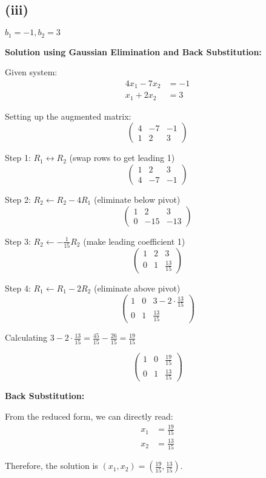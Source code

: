 \subsection*{(iii)} $b_1 = -1, b_2 = 3$

\textbf{Solution using Gaussian Elimination and Back Substitution:}

Given system:
\begin{align}
	4x_1 - 7x_2 & = -1 \\
	x_1 + 2x_2  & = 3
\end{align}

Setting up the augmented matrix:
\[
	\left(\begin{array}{cc|c}
			4 & -7 & -1 \\
			1 & 2  & 3
		\end{array}\right)
\]

Step 1: $R_1 \leftrightarrow R_2$ (swap rows to get leading 1)
\[
	\left(\begin{array}{cc|c}
			1 & 2  & 3  \\
			4 & -7 & -1
		\end{array}\right)
\]

Step 2: $R_2 \leftarrow R_2 - 4R_1$ (eliminate below pivot)
\[
	\left(\begin{array}{cc|c}
			1 & 2   & 3   \\
			0 & -15 & -13
		\end{array}\right)
\]

Step 3: $R_2 \leftarrow -\frac{1}{15}R_2$ (make leading coefficient 1)
\[
	\left(\begin{array}{cc|c}
			1 & 2 & 3             \\
			0 & 1 & \frac{13}{15}
		\end{array}\right)
\]

Step 4: $R_1 \leftarrow R_1 - 2R_2$ (eliminate above pivot)
\[
	\left(\begin{array}{cc|c}
			1 & 0 & 3 - 2 \cdot \frac{13}{15} \\
			0 & 1 & \frac{13}{15}
		\end{array}\right)
\]

Calculating $3 - 2 \cdot \frac{13}{15} = \frac{45}{15} - \frac{26}{15} = \frac{19}{15}$

\[
	\left(\begin{array}{cc|c}
			1 & 0 & \frac{19}{15} \\
			0 & 1 & \frac{13}{15}
		\end{array}\right)
\]

\textbf{Back Substitution:}

From the reduced form, we can directly read:
\begin{align*}
	x_1 & = \frac{19}{15} \\
	x_2 & = \frac{13}{15}
\end{align*}

Therefore, the solution is $\boxed{\left(x_1, x_2\right) = \left(\frac{19}{15}, \frac{13}{15}\right)}$.